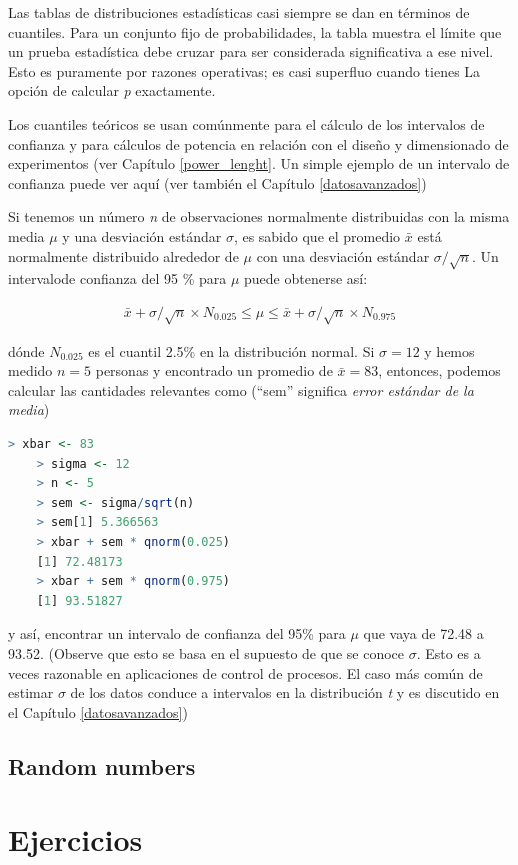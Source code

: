 Las tablas de distribuciones estadísticas casi siempre se dan en términos de
cuantiles. Para un conjunto fijo de probabilidades, la tabla muestra el límite que un
prueba estadística debe cruzar para ser considerada significativa a ese nivel.
Esto es puramente por razones operativas; es casi superfluo cuando tienes
La opción de calcular \textit{p} exactamente.

Los cuantiles teóricos se usan comúnmente para el cálculo de los intervalos de
confianza y para cálculos de potencia en relación con el diseño y dimensionado
de experimentos (ver Capítulo \ref{power_lenght}. Un simple ejemplo de un
intervalo de confianza puede ver aquí (ver también el Capítulo
\ref{datosavanzados})

Si tenemos un número \textit{n} de observaciones normalmente distribuidas con la
misma media $\mu$ y una desviación estándar $\sigma$, es sabido que el promedio
$\bar{x}$ está normalmente distribuido alrededor de $\mu$ con una desviación
estándar $\sigma/\sqrt{n}$. Un intervalode confianza del 95 \% para  $\mu$ puede
obtenerse así:

\begingroup
\Large
\begin{gather*}
    \bar{x} + \sigma/\sqrt{n}\times N _{0.025} \leq \mu \leq \bar{x} +\sigma / \sqrt{n} \times N _{0.975}
\end{gather*}
\endgroup

dónde $N _{0.025}$ es el cuantil 2.5\% en la distribución normal. Si $\sigma =
12$ y hemos medido $n = 5$ personas y encontrado un promedio de $\bar{x} = 83$,
entonces, podemos calcular las cantidades relevantes como (``sem'' significa
\textit{error estándar de la media})

\begin{lstlisting}[language=R]
    > xbar <- 83
    > sigma <- 12
    > n <- 5
    > sem <- sigma/sqrt(n)
    > sem[1] 5.366563
    > xbar + sem * qnorm(0.025)
    [1] 72.48173
    > xbar + sem * qnorm(0.975)
    [1] 93.51827
\end{lstlisting}

y así, encontrar un intervalo de confianza del 95\% para $\mu$ que vaya de 72.48
a 93.52. (Observe que esto se basa en el supuesto de que se conoce $\sigma$.
Esto es a veces razonable en aplicaciones de control de procesos. El caso más
común de estimar $\sigma$ de los datos conduce a intervalos en la distribución
\textit{t} y es discutido en el Capítulo \ref{datosavanzados})



\subsection{Random numbers}
\section{Ejercicios}
\newpage

